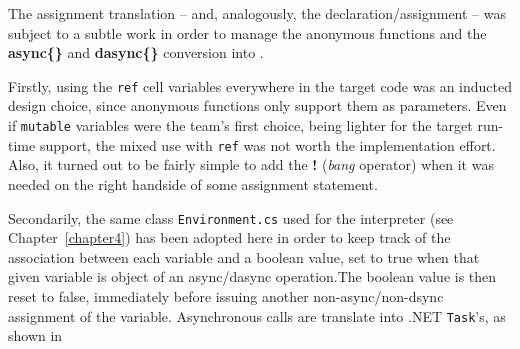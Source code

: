 The assignment translation -- and, analogously, the declaration/assignment -- was subject to a subtle work in order to manage the anonymous functions and the \textbf{async\{\}} and \textbf{dasync\{\}} conversion into \fsharp. 

Firstly, using the \texttt{ref} cell variables everywhere in the target code was an inducted design choice, since \fsharp anonymous functions only support them as parameters. Even if \texttt{mutable} variables were the team's first choice, being lighter for the target run-time support, the mixed use with \texttt{ref} was not worth the implementation effort. Also, it turned out to be fairly simple to add the \textbf{!} (\textit{bang} operator) when it was needed on the right handside of some assignment statement.

Secondarily, the same class \texttt{Environment.cs} used for the interpreter (see Chapter~\ref{chapter4}) has been adopted here in order to keep track of the association between each variable and a boolean value, set to true when that given variable is object of an async/dasync operation.The boolean value is then reset to false, immediately before issuing another non-async/non-dsync assignment of the variable. Asynchronous calls are translate into .NET \texttt{Task}'s, as shown in %




